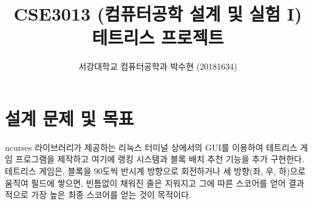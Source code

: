 

\usepackage{color}
\usepackage{pgfplots}

\newdimen\omsq     \omsq=20pt
\newdimen\omrule   \omrule=2pt
\newdimen\omint

\newif\ifvth    \newif\ifhth    \newif\ifomblank
\def\OMINO#1{%
    \vthtrue \hthtrue
    \vbox{ \offinterlineskip\parindent=0pt \OM#1\relax\vskip1pt}
    }

\def\OM#1{%
    \omint=\omsq    \advance\omint-\omrule
    \ifx\relax#1%
    \else
      \ifx\\#1 \newline\null \hthtrue \ifvth\vthfalse\else\vskip-\omrule\vthtrue\fi
      \else%
        \ifx .#1\hskip\ifhth \omrule\else \omint\fi
        \else%
          \ifx +#1\def\colour{black}\fi%
          \ifx -#1\def\colour{black}\fi%
          \ifx |#1\def\colour{black}\fi%
          \ifx @#1\def\colour{black}\fi%
          \ifx X#1\def\colour{gray}\fi%
          \ifx Z#1\def\colour{red}\fi%
          \ifx S#1\def\colour{green}\fi%
          \ifx L#1\def\colour{orange}\fi%
          \ifx J#1\def\colour{blue}\fi%
          \ifx O#1\def\colour{yellow}\fi%
          \ifx T#1\def\colour{magenta}\fi%
          \ifx I#1\def\colour{cyan}\fi%
          \textcolor{\colour}{\rule{\ifhth\omrule\else\omsq\fi}{\ifvth\omrule\else\omsq\fi}}%
          \ifhth\else\hskip -\omrule\fi%
        \fi%
        \ifhth\hthfalse\else\hthtrue\fi%
      \fi%
    \expandafter\OM%
    \fi}

\makeatother

\usepackage{wrapfig}
\usepackage{subfig}



\title{CSE3013 (컴퓨터공학 설계 및 실험 I) \space \newline 테트리스 프로젝트}
\author{서강대학교 컴퓨터공학과 박수현 (20181634)}
\maketitle

\section{설계 문제 및 목표}
ncurses 라이브러리가 제공하는 리눅스 터미널 상에서의 GUI를 이용하여 테트리스 게임 프로그램을 제작하고 여기에 랭킹 시스템과 블록 배치 추천 기능을 추가 구현한다.
테트리스 게임은, 블록을 90도씩 반시계 방향으로 회전하거나 세 방향(좌, 우, 하)으로 움직여 필드에 쌓으면, 빈틈없이 채워진 줄은 지워지고 그에 따른 스코어를 얻어 결과적으로 가장 높은 최종 스코어를 얻는 것이 목적이다. 

